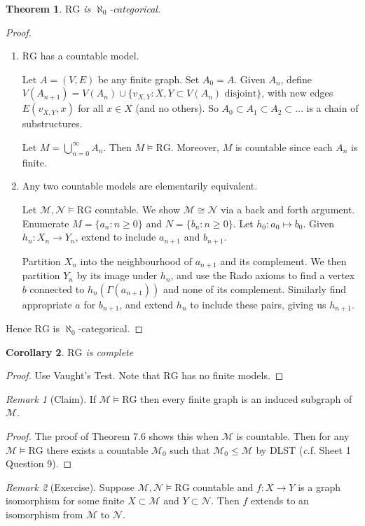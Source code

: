 \documentclass[]{article}
\theoremstyle{custhm}
\newtheorem{theorem}{Theorem}[section]
\theoremstyle{cusdef}
\theoremstyle{custhm}
\theoremstyle{custhm}
\newtheorem{cor}[theorem]{Corollary}
\theoremstyle{custhm}
\theoremstyle{ex}
\theoremstyle{custhm}
\theoremstyle{cusdef}
\theoremstyle{remark}
\newtheorem*{remark*}{Remark}
\theoremstyle{remark}
\newcommand{\ra}{\rightarrow}
\renewcommand{\it}[1]{\textit{#1}}
\newcommand{\M}{\mathcal{M}}
\newcommand{\N}{\mathcal{N}}
\newcommand{\rg}{\textrm{RG}}
\begin{document}
\begin{theorem}
$\rg$ is $\aleph_0$-categorical.
\end{theorem}
\begin{proof}\ 
\begin{enumerate}[label=\arabic*)]
	\item $\rg$ has a countable model.
	
	Let $A = (V,E)$ be any finite graph. Set $A_0 = A$. Given $A_n$, define $V(A_{n+1}) = V(A_n)\cup\{v_{X,Y}:X,Y\subset V(A_n)\textrm{ disjoint}\}$, with new edges $E(v_{X,Y},x)$ for all $x\in X$ (and no others). So $A_0\subset A_1\subset A_2\subset\dots$ is a chain of substructures.
	
	Let $M = \bigcup_{n=0}^{\infty}A_n$. Then $M\models\rg$. Moreover, $M$ is countable since each $A_n$ is finite. 
	
	\item Any two countable models are elementarily equivalent.
	
	Let $\M,\N\models \rg$ countable. We show $\M\cong \N$ via a back and forth argument. Enumerate $M = \{a_n : n\ge 0\}$ and $N = \{b_n:n\ge 0\}$. Let $h_0: a_0\mapsto b_0$. Given $h_n:X_n\ra Y_n$, extend to include $a_{n+1}$ and $b_{n+1}$.
	
	Partition $X_n$ into the neighbourhood of $a_{n+1}$ and its complement. We then partition $Y_n$ by its image under $h_n$, and use the Rado axioms to find a vertex $b$ connected to $h_n(\Gamma(a_{n+1}))$ and none of its complement. Similarly find appropriate $a$ for $b_{n+1}$, and extend $h_n$ to include these pairs, giving us $h_{n+1}$.
\end{enumerate}
Hence $\rg$ is $\aleph_0$-categorical.
\end{proof}
\begin{cor}
$\rg$ is complete
\end{cor}
\begin{proof}
Use Vaught's Test. Note that $\rg$ has no finite models.
\end{proof}
\begin{remark*}[Claim]
If $\M\models \rg$ then every finite graph is an induced subgraph of $\M$.
\end{remark*}
\begin{proof}
The proof of Theorem 7.6 shows this when $\M$ is countable. Then for any $\M\models \rg$ there exists a countable $\M_0$ such that $\M_0\le \M$ by DLST ({\it c.f.} Sheet 1 Question 9).
\end{proof}
\begin{remark*}[Exercise]
	Suppose $\M,\N\models\rg$ countable and $f: X\ra Y$ is a graph isomorphism for some finite $X\subset \M$ and $Y\subset \N$. Then $f$ extends to an isomorphism from $\M$ to $\N$.
\end{remark*}
\end{document}
